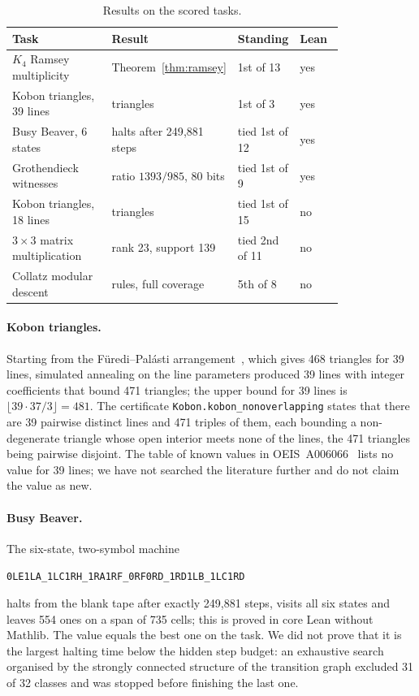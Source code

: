 \documentclass[11pt,a4paper]{article}
\newcommand{\lean}[1]{\texttt{#1}}
\theoremstyle{remark}
\begin{document}
\begin{table}[ht]
\centering\small
\caption{Results on the scored tasks.}\label{tab:hills}
\begin{tabular}{@{}>{\raggedright\arraybackslash}p{0.3\linewidth}>{\raggedright\arraybackslash}p{0.33\linewidth}>{\raggedright\arraybackslash}p{0.18\linewidth}l@{}}
\toprule
Task & Result & Standing & Lean\\\midrule
$K_4$ Ramsey multiplicity & Theorem~\ref{thm:ramsey} & 1st of 13 & yes\\
Kobon triangles, 39 lines & 471 triangles & 1st of 3 & yes\\
Busy Beaver, 6 states & halts after 249{,}881 steps & tied 1st of 12 & yes\\
Grothendieck witnesses & ratio $1393/985$, 80 bits & tied 1st of 9 & yes\\
Kobon triangles, 18 lines & 93 triangles & tied 1st of 15 & no\\
$3\times3$ matrix multiplication & rank 23, support 139 & tied 2nd of 11 & no\\
Collatz modular descent & 234 rules, full coverage & 5th of 8 & no\\
\bottomrule
\end{tabular}
\end{table}

\paragraph{Kobon triangles.}
Starting from the F\"uredi--Pal\'asti arrangement~\cite{fp}, which gives 468 triangles for 39 lines, simulated
annealing on the line parameters produced 39 lines with integer coefficients that bound 471 triangles; the upper
bound for 39 lines is $\lfloor 39\cdot 37/3\rfloor=481$. The certificate \lean{Kobon.kobon\_nonoverlapping} states that
there are 39 pairwise distinct lines and 471 triples of them, each bounding a non-degenerate triangle whose open
interior meets none of the lines, the 471 triangles being pairwise disjoint. The table of known values in
OEIS~A006066~\cite{oeis} lists no value for 39 lines; we have not searched the literature further and do not claim
the value as new.

\paragraph{Busy Beaver.}
The six-state, two-symbol machine
\begin{center}\lean{0LE1LA\_1LC1RH\_1RA1RF\_0RF0RD\_1RD1LB\_1LC1RD}\end{center}
halts from the blank tape after exactly 249{,}881 steps, visits all six states and leaves 554 ones on a span of 735
cells; this is proved in core Lean without Mathlib. The value equals the best one on the task. We did not prove that
it is the largest halting time below the hidden step budget: an exhaustive search organised by the strongly connected
structure of the transition graph excluded 31 of 32 classes and was stopped before finishing the last one.
\end{document}
